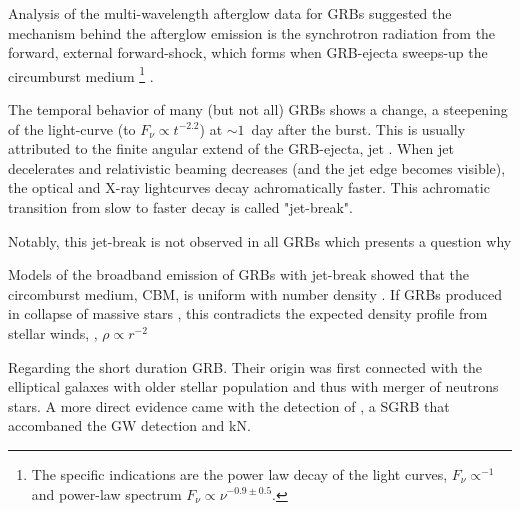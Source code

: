 Analysis of the multi-wavelength afterglow data for \acp{GRB} \cite[\eg][]{Panaitescu:2001bx} suggested the mechanism behind the afterglow emission is the synchrotron radiation from the forward, external forward-shock, which forms when \ac{GRB}-ejecta sweeps-up the circumburst medium
\footnote{The specific indications are the power law decay of the light curves, $F_{\nu}\propto^{-1}$ and power-law spectrum $F_{\nu}\propto\nu^{-0.9\pm 0.5}$.} 
\citep{Rees:1992ek,Paczynski:1993gz,Meszaros:1993ju,Meszaros:1996sv}.

The temporal behavior of many (but not all) \acp{GRB} shows a change, a steepening of the light-curve (to $F_{\nu}\propto t^{-2.2}$) at $\sim 1$~day after the burst. This is usually attributed to the 
finite angular extend of the \ac{GRB}-ejecta, jet \citep[\eg][]{Rhoads:1999wm,Sari:1999mr}. When jet decelerates and relativistic beaming decreases (and the jet edge becomes visible), the optical and X-ray lightcurves decay achromatically faster. This achromatic transition from slow to faster decay is called "jet-break".

Notably, this jet-break is not observed in all GRBs which presents a question why \citep[\eg][]{Fan:2006pj,Panaitescu:2006,Liang:2007ti,Sato:2006jg,Liang:2007rn,Curran:2007cp,Racusin:2008bx}

Models of the broadband emission of \acp{GRB} with jet-break showed that the circomburst medium, \ac{CBM}, is uniform with number density  \citep{Panaitescu:2001bx}. If \acp{GRB} produced in collapse of massive stars \citep{Woosley:1993,Paczynski:1997yg}, this contradicts the expected density profile from stellar winds, \eg, $\rho\propto r^{-2}$ \citep[\eg][]{Dai:1998iz, Chevalier:1999jy, Chevalier:1999mi,Ramirez-Ruiz:2001} 

Regarding the short duration \ac{GRB}. Their origin was first connected with the elliptical galaxes with older stellar population \citep[\eg][]{Gehrels:2005qk,Fox:2005kv,Barthelmy:2005bx,Berger:2005dr,Panaitescu:2005er,Bloom:2005qx,Guetta:2005bb,Nakar:2007yr} and thus with merger of neutrons stars. A more direct evidence came with the detection of \GRB{} \cite{Abbott:2018wiz}, a \ac{SGRB} that accombaned the \ac{GW} detection and \ac{kN}.

